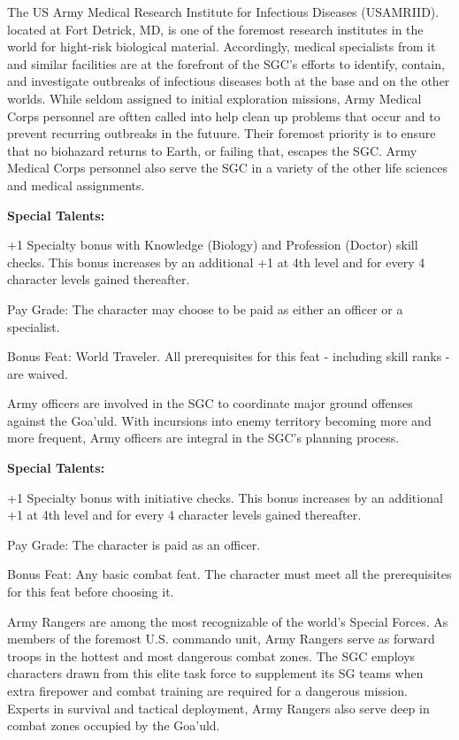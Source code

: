 The US Army Medical Research Institute for Infectious Diseases (USAMRIID). located at Fort Detrick, MD, is one of the foremost research institutes in the world for hight-risk biological material. Accordingly, medical specialists from it and similar facilities are at the forefront of the SGC's efforts to identify, contain, and investigate outbreaks of infectious diseases both at the base and on the other worlds. While seldom assigned to initial exploration missions, Army Medical Corps personnel are oftten called into help clean up problems that occur and to prevent recurring outbreaks in the futuure. Their foremost priority is to ensure that no biohazard returns to Earth, or failing that, escapes the SGC. Army Medical Corps personnel also serve the SGC in a variety of the other life sciences and medical assignments.

\textbf{Special Talents:}
\begin{itemize*}
\item +1 Specialty bonus with Knowledge (Biology) and Profession (Doctor) skill checks. This bonus increases by an additional +1 at 4th level and for every 4 character levels gained thereafter.
\item Pay Grade: The character may choose to be paid as either an officer or a specialist.
\item Bonus Feat: World Traveler. All prerequisites for this feat - including skill ranks - are waived.
\end{itemize*}

Army officers are involved in the SGC to coordinate major ground offenses against the Goa'uld. With incursions into enemy territory becoming more and more frequent, Army officers are integral in the SGC's planning process.

\textbf{Special Talents:}
\begin{itemize*}
\item +1 Specialty bonus with initiative checks. This bonus increases by an additional +1 at 4th level and for every 4 character levels gained thereafter.
\item Pay Grade: The character is paid as an officer.
\item Bonus Feat: Any basic combat feat. The character must meet all the prerequisites for this feat before choosing it.
\end{itemize*}

Army Rangers are among the most recognizable of the world's Special Forces. As members of the foremost U.S. commando unit, Army Rangers serve as forward troops in the hottest and most dangerous combat zones. The SGC employs characters drawn from this elite task force to supplement its SG teams when extra firepower and combat training are required for a dangerous mission. Experts in survival and tactical deployment, Army Rangers also serve deep in combat zones occupied by the Goa'uld.

